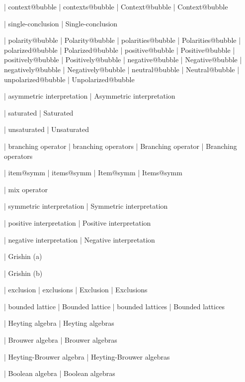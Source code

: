  | context@bubble
 | contexts@bubble
 | Context@bubble
 | Context@bubble

 | single-conclusion
 | Single-conclusion

 | polarity@bubble
 | Polarity@bubble
 | polarities@bubble
 | Polarities@bubble
 | polarized@bubble
 | Polarized@bubble
 | positive@bubble
 | Positive@bubble
 | positively@bubble
 | Positively@bubble
 | negative@bubble
 | Negative@bubble
 | negatively@bubble
 | Negatively@bubble
 | neutral@bubble
 | Neutral@bubble
 | unpolarized@bubble
 | Unpolarized@bubble

 | asymmetric interpretation
 | Asymmetric interpretation

 | saturated
 | Saturated

 | unsaturated
 | Unsaturated

 | branching operator
 | branching operators
 | Branching operator
 | Branching operators

 | item@symm
 | items@symm
 | Item@symm
 | Items@symm

 | mix operator
 
 | symmetric interpretation
 | Symmetric interpretation

 | positive interpretation
 | Positive interpretation

 | negative interpretation
 | Negative interpretation

 | Grishin (a)

 | Grishin (b)

 | exclusion
 | exclusions
 | Exclusion
 | Exclusions
 
 | bounded lattice
 | Bounded lattice
 | bounded lattices
 | Bounded lattices

 | Heyting algebra
 | Heyting algebras

 | Brouwer algebra
 | Brouwer algebras

 | Heyting-Brouwer algebra
 | Heyting-Brouwer algebras

 | Boolean algebra
 | Boolean algebras

